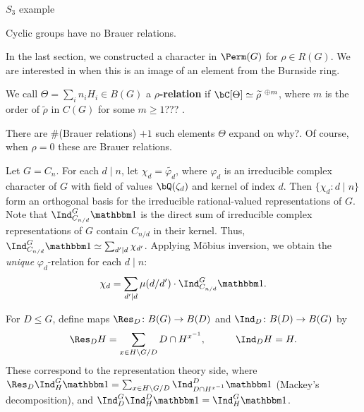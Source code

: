 \begin{example}
    {\color{red} $S_3$ example}
\end{example}

\begin{example}
Cyclic groups have no Brauer relations. 
\end{example}

In the last section, we constructed a character in $\Perm(G)$ for $\rho \in R(G)$. We are interested in when this is an image of an element from the Burnside ring.

\begin{defn}
We call $\Theta = \sum_i n_i H_i \in B(G)$ a \textbf{$\rho$-relation} if $\bC[\Theta] \simeq \widetilde{\rho}^{\ \oplus m}$, where $m$ is the order of $\widetilde{\rho}$ in $C(G)$ {\color{red} for some $m \geq 1$??? }.
\end{defn}
There are $\#$(Brauer relations) $+ 1$ such elements $\Theta$ {\color{red} expand on why?}. Of course, when $\rho = 0$ these are Brauer relations. 


\begin{example}\label{cyclic-relns}
    Let $G = C_n$. For each $d \mid n$, let $\chi_d = \widetilde{\varphi_d}$, where $\varphi_d$ is an irreducible complex character of $G$ with field of values $\bQ(\zeta_d)$ and kernel of index $d$.
    Then $\{ \chi_d \colon d\mid n \}$ form an orthogonal basis for the irreducible rational-valued representations of $G$. Note that $\Ind_{C_{n/ d}}^G \trivial$ is the direct sum of irreducible complex representations of $G$ contain $C_{n / d}$ in their kernel. Thus, $\Ind_{C_{n/ d}}^G \trivial \simeq \sum_{d' \mid d} \chi_{d'}$. Applying M\"{o}bius inversion, we obtain the \textit{unique} $\varphi_d$-relation for each $d \mid n$:
    \[ \chi_d = \sum_{d' \mid d} \mu(d / d') \cdot \Ind_{C_{n/ d}}^G \trivial. \]
    \end{example}

\begin{notn}
    For $D \leq G$, define maps $\Res_D \colon B(G) \to B(D)$ and $\Ind_D \colon B(D) \to B(G)$ by
    \[  \Res_D H = \sum_{x \in H \backslash G / D} D \cap H^{x^{-1}}, \qquad \quad \Ind_D H = H. \]
    These correspond to the representation theory side, where $\Res_D \Ind_{H}^G \trivial = \sum_{x \in H \backslash G / D} \Ind_{D \cap H^{x^{-1}}}^D \trivial$ (Mackey's decomposition), and $\Ind_{D}^G\Ind_{H}^D \trivial = \Ind_{H}^G \trivial$.
\end{notn}